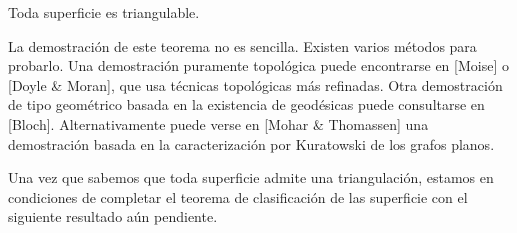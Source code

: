 \documentclass[GTS.tex]{subfiles}
\begin{document}
\begin{teorema}
Toda superficie es triangulable.
\end{teorema}

La demostración de este teorema no es sencilla. Existen varios métodos para probarlo. Una demostración puramente topológica puede encontrarse en [Moise] o [Doyle \& Moran], que usa técnicas topológicas más refinadas. Otra demostración de tipo geométrico basada en la existencia de geodésicas puede consultarse en [Bloch]. Alternativamente puede verse en [Mohar \& Thomassen] una demostración basada en la caracterización por Kuratowski de los grafos planos.

Una vez que sabemos que toda superficie admite una triangulación, estamos en condiciones de completar el teorema de clasificación de las superficie con el siguiente resultado aún pendiente.
\end{document}
